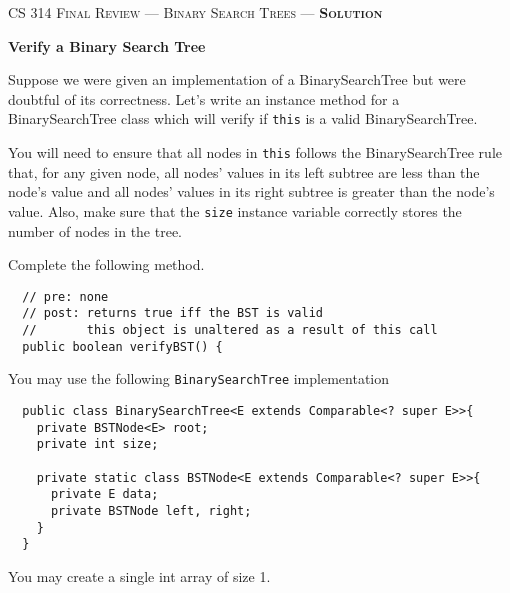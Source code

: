 \documentclass[12pt,letter]{article}
\begin{document}
\noindent\textsc{\large CS 314 Final Review --- Binary Search Trees --- \textbf{Solution}} 

\vspace{6pt}
\noindent\textbf{Verify a Binary Search Tree}

\vspace{2pt}
\noindent Suppose we were given an implementation of a BinarySearchTree but were doubtful of its correctness.
Let's write an instance method for a BinarySearchTree class which will verify if \texttt{this} is a valid BinarySearchTree.

\vspace{4pt}

\noindent You will need to ensure that all nodes in \texttt{this} follows the BinarySearchTree rule that, for any given node, all nodes' values in its 
left subtree are less than the node's value and all nodes' values in its right subtree is greater than the node's value. Also, make sure
that the \texttt{size} instance variable correctly stores the number of nodes in the tree.

\vspace{4pt}
\noindent Complete the following method.
\begin{verbatim}
  // pre: none
  // post: returns true iff the BST is valid
  //       this object is unaltered as a result of this call
  public boolean verifyBST() {
\end{verbatim}

\vspace{4pt}

\vspace{4pt}
\noindent You may use the following \texttt{BinarySearchTree} implementation

\begin{verbatim}
  public class BinarySearchTree<E extends Comparable<? super E>>{
    private BSTNode<E> root;
    private int size;

    private static class BSTNode<E extends Comparable<? super E>>{
      private E data;
      private BSTNode left, right;
    }
  }
\end{verbatim}

\noindent You may create a single int array of size 1.
\end{document}

